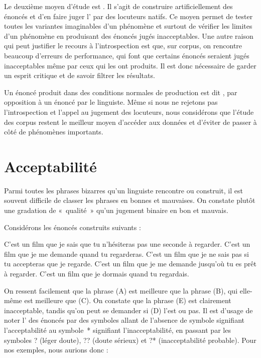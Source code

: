 Le deuxième moyen d’étude est . Il s’agit de construire artificielle\-ment des énoncés et d’en faire juger l’ par des locuteurs natifs. Ce moyen permet de tester toutes les variantes imaginables d’un phénomène et surtout de vérifier les limites d’un phénomène en produisant des énoncés jugés inacceptables. Une autre raison qui peut justifier le recours à l’introspection est que, sur corpus, on rencontre beaucoup d’erreurs de performance, qui font que certains énoncés seraient jugés inacceptables même par ceux qui les ont produits. Il est donc nécessaire de garder un esprit critique et de savoir filtrer les résultats.

Un énoncé produit dans des conditions normales de production est dit , par opposition à un énoncé  par le linguiste. Même si nous ne rejetons pas l’introspection et l’appel au jugement des locuteurs, nous considérons que l’étude des corpus restent le meilleur moyen d’accéder aux données et d’éviter de passer à côté de phénomènes importants.

\section{Acceptabilité}\label{sec:1.1.11}

Parmi toutes les phrases bizarres qu’un linguiste rencontre ou construit, il est souvent difficile de classer les phrases en bonnes et mauvaises. On constate plutôt une gradation de «~qualité~» qu’un jugement binaire en bon et mauvais.

Considérons les énoncés construits suivants :

\ea
\ea C’est un film que je sais que tu n’hésiteras pas une seconde à regarder.
\ex C’est un film que je me demande quand tu regarderas.
\ex C’est un film que je ne sais pas si tu accepteras que je regarde.
\ex C’est un film que je me demande jusqu’où tu es prêt à regarder.
\ex C’est un film que je dormais quand tu regardais.
\z
\z

On ressent facilement que la phrase (A) est meilleure que la phrase (B), qui elle-même est meilleure que (C). On constate que la phrase (E) est clairement inacceptable, tandis qu’on peut se demander si (D) l’est ou pas. Il est d’usage de noter l’ des énoncés par des symboles allant de l’absence de symbole signifiant l’acceptabilité au symbole~* signifiant l’inacceptabilité, en passant par les symboles ? (léger doute), ?? (doute sérieux) et ?* (inacceptabilité probable). Pour nos exemples, nous aurions donc :

